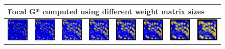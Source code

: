 \documentclass{itatnew}
\begin{document}
\begin{figure}[htp]
\begin{tabular}{cccccccc}
  \end{tabular}
  \begin{tabular}{cccccccc}
    \multicolumn{8}{l}{Focal G* computed using different weight matrix sizes} \\
    \hline
    \vspace*{2mm}
    \includegraphics[width=4.6em]{images/gen-raw-blur-focalgstar-1}&
    \includegraphics[width=4.6em]{images/gen-raw-blur-focalgstar-2}&
    \includegraphics[width=4.6em]{images/gen-raw-blur-focalgstar-3}&
    \includegraphics[width=4.6em]{images/gen-raw-blur-focalgstar-4}&
    \includegraphics[width=4.6em]{images/gen-raw-blur-focalgstar-5}&
    \includegraphics[width=4.6em]{images/gen-raw-blur-focalgstar-6}&
    \includegraphics[width=4.6em]{images/gen-raw-blur-focalgstar-7}&
    \includegraphics[width=4.6em]{images/gen-raw-blur-focalgstar-8}
  \end{tabular}
  

\end{figure}
\end{document}
